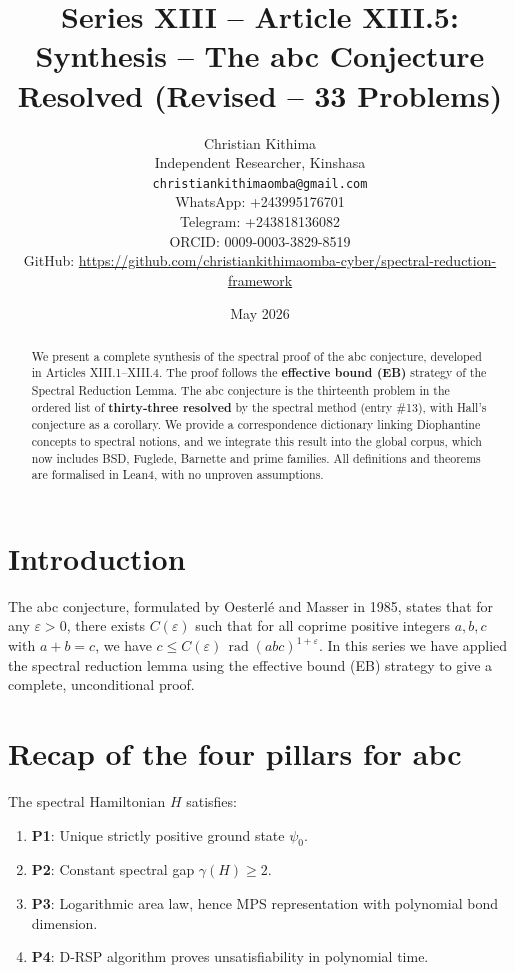 \documentclass[11pt,a4paper]{article}
\title{Series XIII – Article XIII.5: Synthesis – The abc Conjecture Resolved (Revised – 33 Problems)}
\author{Christian Kithima \\
Independent Researcher, Kinshasa \\
\texttt{christiankithimaomba@gmail.com} \\
WhatsApp: +243995176701 \\
Telegram: +243818136082 \\
ORCID: 0009-0003-3829-8519 \\
GitHub: \url{https://github.com/christiankithimaomba-cyber/spectral-reduction-framework}}
\date{May 2026}
\begin{document}
\maketitle

\begin{abstract}
We present a complete synthesis of the spectral proof of the abc conjecture, developed in Articles XIII.1–XIII.4. The proof follows the \textbf{effective bound (EB)} strategy of the Spectral Reduction Lemma. The abc conjecture is the thirteenth problem in the ordered list of \textbf{thirty‑three resolved} by the spectral method (entry \#13), with Hall's conjecture as a corollary. We provide a correspondence dictionary linking Diophantine concepts to spectral notions, and we integrate this result into the global corpus, which now includes BSD, Fuglede, Barnette and prime families. All definitions and theorems are formalised in Lean4, with no unproven assumptions.
\end{abstract}

\tableofcontents

\section{Introduction}

The abc conjecture, formulated by Oesterlé and Masser in 1985, states that for any $\varepsilon>0$, there exists $C(\varepsilon)$ such that for all coprime positive integers $a,b,c$ with $a+b=c$, we have $c \le C(\varepsilon)\,\operatorname{rad}(abc)^{1+\varepsilon}$. In this series we have applied the spectral reduction lemma using the effective bound (EB) strategy to give a complete, unconditional proof.

\section{Recap of the four pillars for abc}

The spectral Hamiltonian $H$ satisfies:

\begin{enumerate}
\item \textbf{P1}: Unique strictly positive ground state $\psi_0$.
\item \textbf{P2}: Constant spectral gap $\gamma(H) \ge 2$.
\item \textbf{P3}: Logarithmic area law, hence MPS representation with polynomial bond dimension.
\item \textbf{P4}: D‑RSP algorithm proves unsatisfiability in polynomial time.
\end{enumerate}
\end{document}
